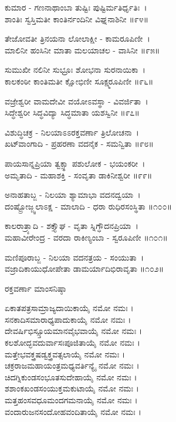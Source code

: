 ಕುಮಾರ - ಗಣನಾಥಾಂಬಾ ತುಷ್ಟಿಃ ಪುಷ್ಟಿರ್ಮತಿರ್ಧೃತಿಃ~।\\
ಶಾಂತಿಃ ಸ್ವಸ್ತಿಮತೀ ಕಾಂತಿರ್ನಂದಿನೀ ವಿಘ್ನನಾಶಿನೀ ॥೯೪॥

ತೇಜೋವತೀ ತ್ರಿನಯನಾ ಲೋಲಾಕ್ಷೀ - ಕಾಮರೂಪಿಣೀ~।\\
ಮಾಲಿನೀ ಹಂಸಿನೀ ಮಾತಾ ಮಲಯಾಚಲ - ವಾಸಿನೀ ॥೯೫॥

ಸುಮುಖೀ ನಲಿನೀ ಸುಭ್ರೂಃ ಶೋಭನಾ ಸುರನಾಯಿಕಾ~।\\
ಕಾಲಕಂಠೀ ಕಾಂತಿಮತೀ ಕ್ಷೋಭಿಣೀ ಸೂಕ್ಷ್ಮರೂಪಿಣೀ ॥೯೬॥

ವಜ್ರೇಶ್ವರೀ ವಾಮದೇವೀ ವಯೋಽವಸ್ಥಾ - ವಿವರ್ಜಿತಾ~।\\
ಸಿದ್ಧೇಶ್ವರೀ ಸಿದ್ಧವಿದ್ಯಾ ಸಿದ್ಧಮಾತಾ ಯಶಸ್ವಿನೀ ॥೯೭॥

ವಿಶುದ್ಧಿಚಕ್ರ - ನಿಲಯಾಽಽರಕ್ತವರ್ಣಾ ತ್ರಿಲೋಚನಾ~।\\
ಖಟ್‍ವಾಂಗಾದಿ - ಪ್ರಹರಣಾ ವದನೈಕ - ಸಮನ್ವಿತಾ ॥೯೮॥

ಪಾಯಸಾನ್ನಪ್ರಿಯಾ ತ್ವಕ್ಸ್ಥಾ ಪಶುಲೋಕ - ಭಯಂಕರೀ~।\\
ಅಮೃತಾದಿ - ಮಹಾಶಕ್ತಿ - ಸಂವೃತಾ ಡಾಕಿನೀಶ್ವರೀ ॥೯೯॥

ಅನಾಹತಾಬ್ಜ - ನಿಲಯಾ ಶ್ಯಾಮಾಭಾ ವದನದ್ವಯಾ~।\\
ದಂಷ್ಟ್ರೋಜ್ಜ್ವಲಾಽಕ್ಷ - ಮಾಲಾದಿ - ಧರಾ ರುಧಿರಸಂಸ್ಥಿತಾ ॥೧೦೦॥

ಕಾಲರಾತ್ರ್ಯಾದಿ - ಶಕ್ತ್ಯೌಘ - ವೃತಾ ಸ್ನಿಗ್ಧೌದನಪ್ರಿಯಾ~।\\
ಮಹಾವೀರೇಂದ್ರ - ವರದಾ ರಾಕಿಣ್ಯಂಬಾ - ಸ್ವರೂಪಿಣೀ ॥೧೦೧॥

ಮಣಿಪೂರಾಬ್ಜ - ನಿಲಯಾ ವದನತ್ರಯ - ಸಂಯುತಾ~।\\
ವಜ್ರಾದಿಕಾಯುಧೋಪೇತಾ ಡಾಮರ್ಯಾದಿಭಿರಾವೃತಾ ॥೧೦೨॥

ರಕ್ತವರ್ಣಾ ಮಾಂಸನಿಷ್ಠಾ 

ಏಕಾತಪತ್ರಸಾಮ್ರಾಜ್ಯದಾಯಿಕಾಯೈ ನಮೋ ನಮಃ ।\\
ಸನಕಾದಿಸಮಾರಾಧ್ಯಪಾದುಕಾಯೈ ನಮೋ ನಮಃ ।\\
ದೇವರ್ಷಿಭಿಸ್ಸ್ತೂಯಮಾನವೈಭವಾಯೈ ನಮೋ ನಮಃ ।\\
ಕಲಶೋದ್ಭವದುರ್ವಾಸಃಪೂಜಿತಾಯೈ ನಮೋ ನಮಃ ।\\
ಮತ್ತೇಭವಕ್ತ್ರಷಡ್ವಕ್ತ್ರವತ್ಸಲಾಯೈ ನಮೋ ನಮಃ ।\\
ಚಕ್ರರಾಜಮಹಾಯಂತ್ರಮಧ್ಯವರ್ತಿನ್ಯೈ ನಮೋ ನಮಃ ।\\
ಚಿದಗ್ನಿಕುಂಡಸಂಭೂತಸುದೇಹಾಯೈ ನಮೋ ನಮಃ ।\\
ಶಶಾಂಕಖಂಡಸಂಯುಕ್ತಮಕುಟಾಯೈ ನಮೋ ನಮಃ ।\\
ಮತ್ತಹಂಸವಧೂಮಂದಗಮನಾಯೈ ನಮೋ ನಮಃ ।\\
ವಂದಾರುಜನಸಂದೋಹವಂದಿತಾಯೈ ನಮೋ ನಮಃ ।


